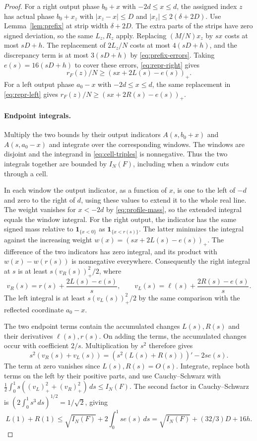 \documentclass[11pt,reqno]{amsart}
\newcommand{\ind}{\mathbf 1}
\numberwithin{equation}{section}
\begin{document}
\begin{proof}
For a right output phase \(b_0+x\) with \(-2d\le x\le d\),
the assigned index \(z\) has actual phase \(b_0+x_z\) with
\(|x_z-x|\le D\) and \(|x_z|\le2(\delta+2D)\).
Use Lemma~\ref{lem:prefix} at strip width \(\delta+2D\).
The extra parts of the strips have zero signed deviation, so
the same \(L_z,R_z\) apply. Replacing \((M/N)x_z\) by \(sx\)
costs at most \(sD+h\). The replacement of \(2L_z/N\) costs
at most \(4(sD+h)\), and the discrepancy term is at most
\(3(sD+h)\) by \eqref{eq:prefix-errors}.
Taking \(e(s)=16(sD+h)\) to cover these errors,
\eqref{eq:repr-right} gives
\[
 r_F(z)/N\ge(sx+2L(s)-e(s))_+ .
\]
For a left output phase \(a_0-x\) with \(-2d\le x\le d\), the same
replacement in \eqref{eq:repr-left} gives
\(r_F(z)/N\ge(sx+2R(s)-e(s))_+\).

\paragraph{Endpoint integrals.}
Multiply the two bounds by their output indicators \(A(s,b_0+x)\)
and \(A(s,a_0-x)\) and integrate over the corresponding windows.
The windows are disjoint and the integrand in
\eqref{eq:cell-triples} is nonnegative. Thus the two integrals
together are bounded by \(I_N(F)\), including when a window cuts
through a cell.

In each window the output indicator, as a function of \(x\),
is one to the left of \(-d\) and zero to the right of \(d\),
using these values to extend it to the whole real line.
The weight vanishes for \(x<-2d\) by \eqref{eq:profile-mass},
so the extended integral equals the window integral.
For the right output, the indicator has the same signed
mass relative to \(\ind_{\{x<0\}}\) as \(\ind_{\{x<r(s)\}}\).
The latter minimizes the integral against the increasing
weight \(w(x)=(sx+2L(s)-e(s))_+\).
The difference of the two indicators has zero integral, and
its product with \(w(x)-w(r(s))\) is nonnegative everywhere.
Consequently the right integral at \(s\) is at least
\(s(v_R(s))_+^2/2\), where
\[
 v_R(s)=r(s)+\frac{2L(s)-e(s)}s,\qquad
 v_L(s)=\ell(s)+\frac{2R(s)-e(s)}s .
\]
The left integral is at least \(s(v_L(s))_+^2/2\) by the same
comparison with the reflected coordinate \(a_0-x\).

The two endpoint terms contain the accumulated changes
\(L(s),R(s)\) and their derivatives \(\ell(s),r(s)\).
On adding the terms, the accumulated changes occur with
coefficient \(2/s\). Multiplication by \(s^2\) therefore gives
\[
 s^2(v_R(s)+v_L(s))=(s^2(L(s)+R(s)))'-2s e(s).
\]
The term at zero vanishes since \(L(s),R(s)=O(s)\). Integrate, replace both
terms on the left by their positive parts, and use
Cauchy--Schwarz with
\(\tfrac12\int_0^1s((v_L)_+^2+(v_R)_+^2)\,ds\le I_N(F)\).
The second factor in Cauchy--Schwarz is
\((2\int_0^1s^3\,ds)^{1/2}=1/\sqrt2\), giving
\[
 L(1)+R(1)\le\sqrt{I_N(F)}+2\int_0^1s e(s)\,ds
            =\sqrt{I_N(F)}+(32/3)D+16h.
\]


\end{proof}
\end{document}
